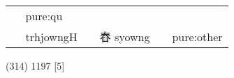 \documentclass[14pt,a4paper]{scrartcl}
\begin{document}
\begin{longtable}[c]{@{}llllll@{}}
\begin{minipage}[t]{0.14\columnwidth}
\strut\end{minipage} &
\begin{minipage}[t]{0.14\columnwidth}\raggedright\strut
pure:qu
\strut\end{minipage}\tabularnewline
\begin{minipage}[t]{0.14\columnwidth}\raggedright\strut
𦥽
\strut\end{minipage} &
\begin{minipage}[t]{0.14\columnwidth}\raggedright\strut
trhjowngH
\strut\end{minipage} &
\begin{minipage}[t]{0.14\columnwidth}\raggedright\strut
\strut\end{minipage} &
\begin{minipage}[t]{0.14\columnwidth}\raggedright\strut
舂 syowng
\strut\end{minipage} &
\begin{minipage}[t]{0.14\columnwidth}\raggedright\strut
\strut\end{minipage} &
\begin{minipage}[t]{0.14\columnwidth}\raggedright\strut
pure:other
\strut\end{minipage}\tabularnewline
\bottomrule
\end{longtable}

(314) 1197 {[}5{]}
\end{document}
